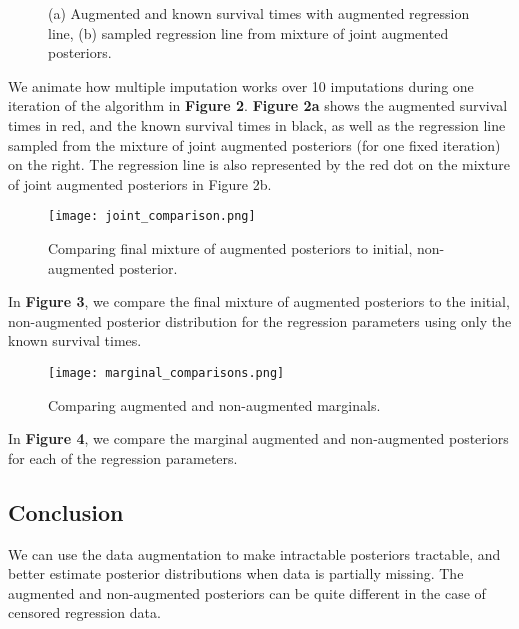 \documentclass{article}
\begin{document}
\begin{figure}[h!]
    \centering
    \caption{(a) Augmented and known survival times with augmented regression line, 
    (b) sampled regression line from mixture of joint augmented posteriors.}
    \label{fig:figure2}
  \end{figure}

We animate how multiple imputation works over 10 imputations during one iteration of the algorithm in \textbf{Figure 2}. 
\textbf{Figure 2a} shows the augmented survival times in red, and the known survival times in black, as well as the regression line
sampled from the mixture of joint augmented posteriors (for one fixed iteration) on the right. The regression line is also represented
by the red dot on the mixture of joint augmented posteriors in Figure 2b. 
\begin{figure}[h!]
  \centering
  \texttt{[image: joint\_comparison.png]}
  \caption{Comparing final mixture of augmented posteriors to initial, non-augmented posterior.}
  \label{fig:figure3}
\end{figure}

In \textbf{Figure 3}, we compare the final mixture of augmented posteriors to the initial, 
non-augmented posterior distribution for the regression
parameters using only the known survival times. 

\begin{figure}[h!]
  \centering
  \texttt{[image: marginal\_comparisons.png]}
  \caption{Comparing augmented and non-augmented marginals.}
  \label{fig:figure4}
\end{figure}

In \textbf{Figure 4}, we compare the marginal augmented and non-augmented posteriors for each of the regression parameters.

\subsection{Conclusion}
We can use the data augmentation to make intractable posteriors tractable, and better estimate posterior distributions
when data is partially missing. The augmented and non-augmented posteriors can be quite different in the case of censored
regression data. 
\end{document}
